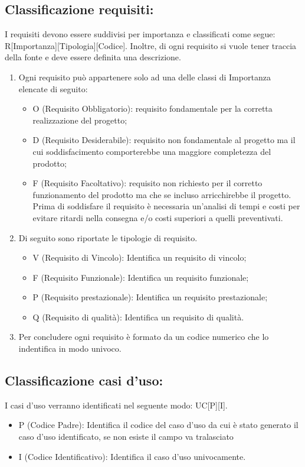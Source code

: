 \documentclass[./../NomeDocumento.tex]{subfiles}
\begin{document}
	\subsection{Classificazione requisiti:} I requisiti devono essere suddivisi per importanza e classificati come segue: R[Importanza][Tipologia][Codice]. Inoltre, di ogni requisito si vuole tener traccia della fonte e deve essere definita una descrizione.
		\begin{enumerate}
			\item Ogni requisito può appartenere solo ad una delle classi di Importanza elencate di seguito:
			\begin{itemize}
				\item O (Requisito Obbligatorio): requisito fondamentale per la corretta realizzazione del progetto;
				\item D (Requisito Desiderabile): requisito non fondamentale al progetto ma il cui soddisfacimento comporterebbe una maggiore completezza del prodotto;
				\item F (Requisito Facoltativo): requisito non richiesto per il corretto funzionamento del prodotto ma che se incluso arricchirebbe il progetto. Prima di soddisfare il requisito è necessaria un’analisi di tempi e costi per evitare ritardi nella consegna e/o costi superiori a quelli preventivati.
			\end{itemize}
			\item Di seguito sono riportate le tipologie di requisito.
			\begin{itemize}
				\item V (Requisito di Vincolo): Identifica un requisito di vincolo;
				\item F (Requisito Funzionale): Identifica un requisito funzionale;
				\item P (Requisito prestazionale): Identifica un requisito prestazionale;
				\item Q (Requisito di qualità): 
				Identifica un requisito di qualità.
			\end{itemize}
		\item Per concludere ogni requisito è formato da un codice numerico che lo indentifica in modo univoco.

		\end{enumerate}
		
	\subsection{Classificazione casi d’uso:} 
	I casi d'uso verranno identificati nel seguente modo: UC[P][I].
	\begin{itemize}
		\item P (Codice Padre): Identifica il codice del caso d'uso da cui è stato generato il caso d'uso identificato, se non esiste il campo va tralasciato
		\item I (Codice Identificativo): Identifica il caso d'uso univocamente.
		\end{itemize}
	
\end{document}
